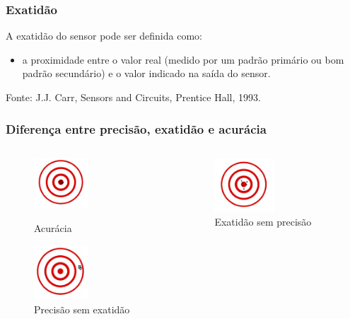 \documentclass[t]{beamer}
\begin{document}
\begin{frame}
\frametitle{Exatidão}
A exatidão do sensor pode ser definida como:
\begin{itemize}
	\item a proximidade entre o valor real (medido por um padrão primário ou bom padrão secundário) e o valor indicado na saída do sensor.
\end{itemize}
{\scriptsize Fonte: J.J. Carr, Sensors and Circuits, Prentice Hall, 1993.}
\end{frame}

\begin{frame}
\frametitle{Diferença entre precisão, exatidão e acurácia}
\begin{columns}
	\begin{column}{0.5\textwidth}
		\begin{figure}
			\includegraphics[width=0.5\textwidth]{acuracia}
			\caption{Acurácia}
			
			\includegraphics[width=0.5\textwidth]{precisaosemexatidao}
			\caption{Precisão sem exatidão}
		\end{figure}
	\end{column}
	\begin{column}{0.5\textwidth}
		\begin{figure}
			\includegraphics[width=0.5\textwidth]{exatidaosemprecisao}
			\caption{Exatidão sem precisão}
			

\end{figure}
\end{column}
\end{columns}
\end{frame}
\end{document}
